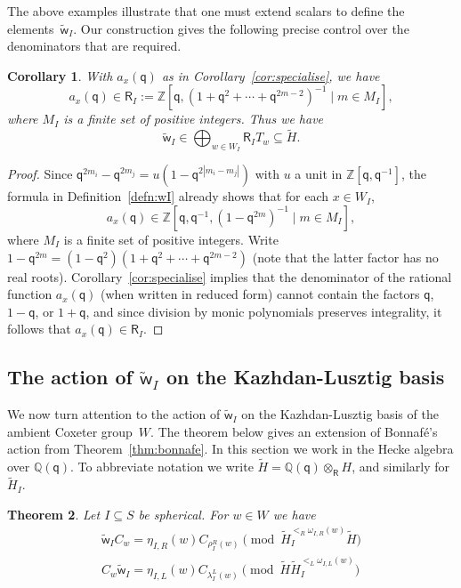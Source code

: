 \documentclass[11pt]{article}
\theoremstyle{plain}
\newtheorem{thm}{Theorem}[section]
\newtheorem{cor}[thm]{Corollary}
\theoremstyle{definition}
\numberwithin{equation}{section}
\def\tw{\widetilde{\mathsf{w}}_I}
\newcommand{\la}{\lambda}
\def\QQ{\mathbb{Q}}
\def\ZZ{\mathbb{Z}}
\def\la{\lambda}
\def\la{\lambda}
\def\sR{\mathsf{R}}
\newcommand{\sq}{\mathsf{q}}
\begin{document}
The above examples illustrate that one must extend scalars to define the elements~$\tw$. Our construction gives the following precise control over the denominators that are required. 

\begin{cor}\label{cor:coefficientring}
With $a_x(\sq)$ as in Corollary~\ref{cor:specialise}, we have 
$$
a_x(\sq)\in\sR_I:=\ZZ[\sq,(1+\sq^2+\cdots+\sq^{2m-2})^{-1}\mid m\in M_I],
$$
where $M_I$ is a finite set of positive integers. Thus we have 
$$
\tw\in \bigoplus_{w\in W_I}\sR_IT_w\subseteq \tilde{H}. 
$$ 
\end{cor}

\begin{proof}
Since
$\sq^{2m_i}-\sq^{2m_j}=u(1-\sq^{2|m_i-m_j|})$ with $u$ a unit in $\ZZ[\sq,\sq^{-1}]$, the formula in Definition~\ref{defn:wI} already shows that for each $x\in W_I$,
$$
a_x(\sq)\in\ZZ[\sq,\sq^{-1},(1-\sq^{2m})^{-1}\mid m\in M_I],
$$
where $M_I$ is a finite set of positive integers. Write $1-\sq^{2m}=(1-\sq^2)(1+\sq^2+\cdots+\sq^{2m-2})$ (note that the latter factor has no real roots). Corollary~\ref{cor:specialise} implies that the denominator of the rational function $a_x(\sq)$ (when written in reduced form) cannot contain the factors $\sq$, $1-\sq$, or $1+\sq$, and since division by monic polynomials preserves integrality, it follows that 
$
a_x(\sq)\in\sR_I
$.
\end{proof}




\subsection{The action of $\tw$ on the Kazhdan-Lusztig basis}\label{sec:actiononKL}

We now turn attention to the action of $\tw$ on the Kazhdan-Lusztig basis of the ambient Coxeter group~$W$. The theorem below gives an extension of Bonnaf\'e's action from Theorem~\ref{thm:bonnafe}. In this section we work in the Hecke algebra over $\QQ(\sq)$. To abbreviate notation we write $\tilde{H}=\QQ(\sq)\otimes_{\sR}H$, and similarly for $\tilde{H}_I$. 

\begin{thm}\label{thm:actiononKLbasis}
Let $I\subseteq S$ be spherical. For $w\in W$ we have
\begin{align*}
\tw C_w=\eta_{I,R}(w)C_{\rho_I^R(w)}\pmod{\tilde{H}_I^{<_R\omega_{I,R}(w)}\tilde{H}}\\
C_w\tw=\eta_{I,L}(w)C_{\la_I^L(w)}\pmod{\tilde{H}\tilde{H}_I^{<_L\omega_{I,L}(w)}}
\end{align*}
\end{thm}
\end{document}
